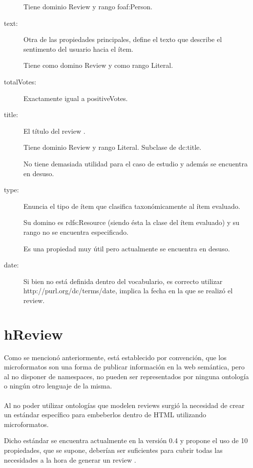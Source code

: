 \begin{description}
  Tiene dominio Review y rango foaf:Person. 
  \item [text:] Otra de las propiedades principales, define el texto que describe el sentimento del usuario hacia el ítem. 
  
  Tiene como domino Review y como rango Literal.
  \item [totalVotes:] Exactamente igual a positiveVotes.
  \item [title:] El título del review . 
  
  Tiene dominio Review y rango Literal. Subclase de dc:title. 
  
  No tiene demasiada utilidad para el caso de estudio y además se encuentra en desuso.
  \item [type:] Enuncia el tipo de ítem que clasifica taxonómicamente al ítem evaluado. 
  
  Su domino es rdfs:Resource (siendo ésta la clase del ítem evaluado) y su rango no se encuentra especificado. 
  
  Es una propiedad muy útil pero actualmente se encuentra en desuso.
  \item [date:] Si bien no está definida dentro del vocabulario, es correcto utilizar http://purl.org/dc/terms/date, implica la fecha
  en la que se realizó el review.
\end{description}

\section{hReview}
\label{section:hreview}

Como se mencionó anteriormente, está establecido por convención, que los microformatos son una forma de publicar información en la 
web semántica, pero al no disponer de namespaces, no pueden ser representados por ninguna ontología o ningún otro lenguaje de la misma. 
\\\\
Al no poder utilizar ontologías que modelen reviews surgió la necesidad de crear un estándar específico para embeberlos dentro de HTML 
utilizando microformatos.

Dicho estándar se encuentra actualmente en la versión 0.4 \cite{Celik} y propone el uso de 10 propiedades, que se supone, deberían ser 
suficientes para cubrir todas las necesidades a la hora de generar un review .

